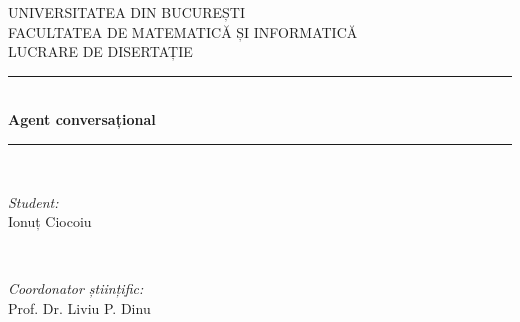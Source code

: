 \begin{titlepage}
	
	\newcommand{\HRule}{\rule{\linewidth}{0.5mm}} %
	
	\center %
	
	
	\textsc{\LARGE UNIVERSITATEA DIN BUCUREȘTI}\\[1.5cm] %
	\textsc{\Large FACULTATEA DE MATEMATICĂ ȘI INFORMATICĂ}\\[0.5cm] %
	\textsc{\large LUCRARE DE DISERTAȚIE}\\[0.5cm] %
	
	
	\HRule \\[0.4cm]
	{ \huge \bfseries Agent conversațional}\\[0.4cm] %
	\HRule \\[1.5cm]
	
	
	\begin{minipage}{0.4\textwidth}
		\begin{flushleft} \large
			\emph{Student:}\\
			Ionuț Ciocoiu %
		\end{flushleft}
	\end{minipage}
	~
	\begin{minipage}{0.4\textwidth}
		\begin{flushright} \large
			\emph{Coordonator științific:} \\
			Prof. Dr. Liviu P. Dinu %
		\end{flushright}
	\end{minipage}\\[4cm]
	
	

\end{titlepage}
